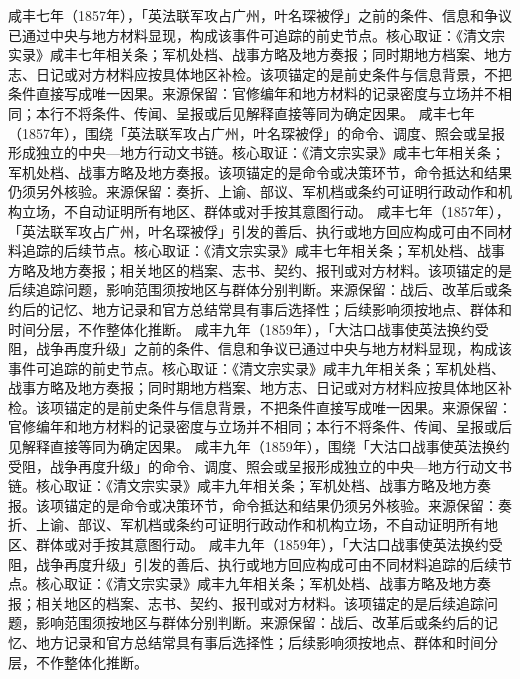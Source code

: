 咸丰七年（1857年），「英法联军攻占广州，叶名琛被俘」之前的条件、信息和争议已通过中央与地方材料显现，构成该事件可追踪的前史节点。核心取证：《清文宗实录》咸丰七年相关条；军机处档、战事方略及地方奏报；同时期地方档案、地方志、日记或对方材料应按具体地区补检。该项锚定的是前史条件与信息背景，不把条件直接写成唯一因果。来源保留：官修编年和地方材料的记录密度与立场并不相同；本行不将条件、传闻、呈报或后见解释直接等同为确定因果。
咸丰七年（1857年），围绕「英法联军攻占广州，叶名琛被俘」的命令、调度、照会或呈报形成独立的中央—地方行动文书链。核心取证：《清文宗实录》咸丰七年相关条；军机处档、战事方略及地方奏报。该项锚定的是命令或决策环节，命令抵达和结果仍须另外核验。来源保留：奏折、上谕、部议、军机档或条约可证明行政动作和机构立场，不自动证明所有地区、群体或对手按其意图行动。
咸丰七年（1857年），「英法联军攻占广州，叶名琛被俘」引发的善后、执行或地方回应构成可由不同材料追踪的后续节点。核心取证：《清文宗实录》咸丰七年相关条；军机处档、战事方略及地方奏报；相关地区的档案、志书、契约、报刊或对方材料。该项锚定的是后续追踪问题，影响范围须按地区与群体分别判断。来源保留：战后、改革后或条约后的记忆、地方记录和官方总结常具有事后选择性；后续影响须按地点、群体和时间分层，不作整体化推断。
咸丰九年（1859年），「大沽口战事使英法换约受阻，战争再度升级」之前的条件、信息和争议已通过中央与地方材料显现，构成该事件可追踪的前史节点。核心取证：《清文宗实录》咸丰九年相关条；军机处档、战事方略及地方奏报；同时期地方档案、地方志、日记或对方材料应按具体地区补检。该项锚定的是前史条件与信息背景，不把条件直接写成唯一因果。来源保留：官修编年和地方材料的记录密度与立场并不相同；本行不将条件、传闻、呈报或后见解释直接等同为确定因果。
咸丰九年（1859年），围绕「大沽口战事使英法换约受阻，战争再度升级」的命令、调度、照会或呈报形成独立的中央—地方行动文书链。核心取证：《清文宗实录》咸丰九年相关条；军机处档、战事方略及地方奏报。该项锚定的是命令或决策环节，命令抵达和结果仍须另外核验。来源保留：奏折、上谕、部议、军机档或条约可证明行政动作和机构立场，不自动证明所有地区、群体或对手按其意图行动。
咸丰九年（1859年），「大沽口战事使英法换约受阻，战争再度升级」引发的善后、执行或地方回应构成可由不同材料追踪的后续节点。核心取证：《清文宗实录》咸丰九年相关条；军机处档、战事方略及地方奏报；相关地区的档案、志书、契约、报刊或对方材料。该项锚定的是后续追踪问题，影响范围须按地区与群体分别判断。来源保留：战后、改革后或条约后的记忆、地方记录和官方总结常具有事后选择性；后续影响须按地点、群体和时间分层，不作整体化推断。
